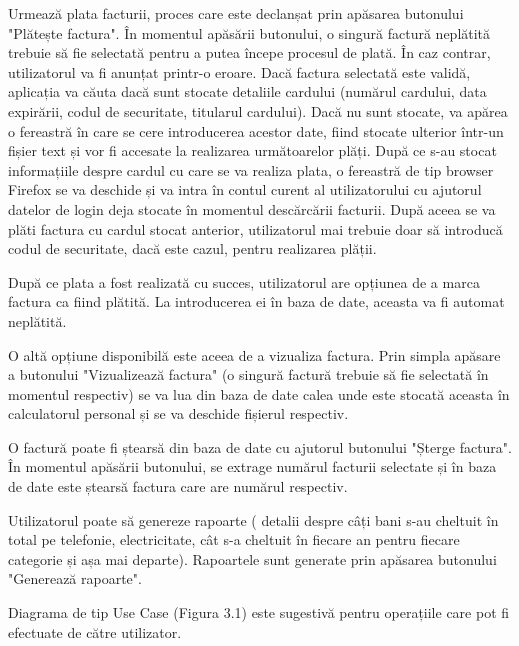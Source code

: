 \documentclass[12pt]{book}
\begin{document}
Urmează plata facturii, proces care este declanșat prin apăsarea butonului "Plătește factura". În momentul apăsării butonului, o singură factură neplătită trebuie să fie selectată pentru a putea începe procesul de plată. În caz contrar, utilizatorul va fi anunțat printr-o eroare. Dacă factura selectată este validă, aplicația va căuta dacă sunt stocate detaliile cardului (numărul cardului, data expirării, codul de securitate, titularul cardului). Dacă nu sunt stocate, va apărea o fereastră în care se cere introducerea acestor date, fiind stocate ulterior într-un fișier text și vor fi accesate la realizarea următoarelor plăți. După ce s-au stocat informațiile despre cardul cu care se va realiza plata, o fereastră de tip browser Firefox se va deschide și va intra în contul curent al utilizatorului cu ajutorul datelor de login deja stocate în momentul descărcării facturii. După aceea se va plăti factura cu cardul stocat anterior, utilizatorul mai trebuie doar să introducă codul de securitate, dacă este cazul, pentru realizarea plății.

După ce plata a fost realizată cu succes, utilizatorul are opțiunea de a marca factura ca fiind plătită. La introducerea ei în baza de date, aceasta va fi automat neplătită. 

O altă opțiune disponibilă este aceea de a vizualiza factura. Prin simpla apăsare a butonului "Vizualizează factura" (o singură factură trebuie să fie selectată în momentul respectiv) se va lua din baza de date calea unde este stocată aceasta în calculatorul personal și se va deschide fișierul respectiv.

O factură poate fi ștearsă din baza de date cu ajutorul butonului "Șterge factura". În momentul apăsării butonului, se extrage numărul facturii selectate și în baza de date este ștearsă factura care are numărul respectiv.

Utilizatorul poate să genereze rapoarte ( detalii despre câți bani s-au cheltuit în total pe telefonie, electricitate, cât s-a cheltuit în fiecare an pentru fiecare categorie și așa mai departe). Rapoartele sunt generate prin apăsarea butonului "Generează rapoarte".

Diagrama de tip Use Case (Figura 3.1) este sugestivă pentru operațiile care pot fi efectuate de către utilizator.
\end{document}
